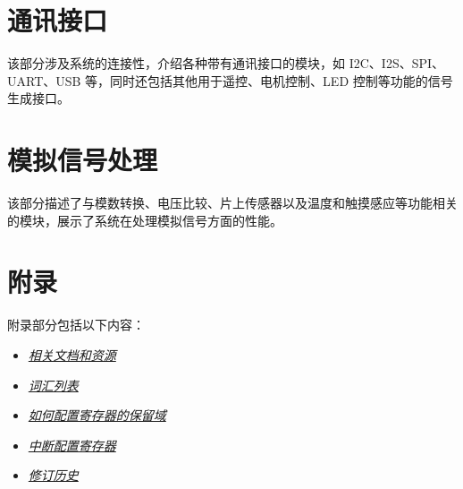 \documentclass[openany, 10pt]{book}
\begin{document}
\part{通讯接口}


该部分涉及系统的连接性，介绍各种带有通讯接口的模块，如 I2C、I2S、SPI、UART、USB 等，同时还包括其他用于遥控、电机控制、LED 控制等功能的信号生成接口。


\part{模拟信号处理}


该部分描述了与模数转换、电压比较、片上传感器以及温度和触摸感应等功能相关的模块，展示了系统在处理模拟信号方面的性能。



\part{附录}\label{appendix}

附录部分包括以下内容：

\begin{itemize}
    \item \hyperref[sec:resources]{\textit{相关文档和资源}}
    \item \hyperref[glossary]{\textit{词汇列表}}
    \item \hyperref[programming-reserved-field]{\textit{如何配置寄存器的保留域}}
    \item \hyperref[interrupt-config-registers]{\textit{中断配置寄存器}}
    \item \hyperref[revision-history]{\textit{修订历史}}
\end{itemize}
\end{document}
